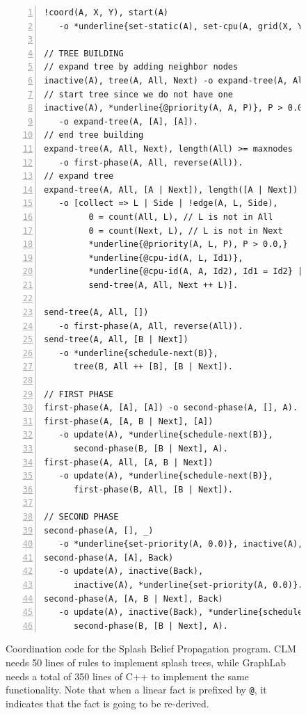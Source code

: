 \begin{figure}[h!]
\scriptsize\begin{Verbatim}[numbers=left,commandchars=*\{\}]
!coord(A, X, Y), start(A)
   -o *underline{set-static(A), set-cpu(A, grid(X, Y))}.

// TREE BUILDING
// expand tree by adding neighbor nodes
inactive(A), tree(A, All, Next) -o expand-tree(A, All, Next).
// start tree since we do not have one
inactive(A), *underline{@priority(A, A, P)}, P > 0.0
   -o expand-tree(A, [A], [A]).
// end tree building
expand-tree(A, All, Next), length(All) >= maxnodes
   -o first-phase(A, All, reverse(All)).
// expand tree
expand-tree(A, All, [A | Next]), length([A | Next]) < maxnodes
   -o [collect => L | Side | !edge(A, L, Side),
         0 = count(All, L), // L is not in All
         0 = count(Next, L), // L is not in Next
         *underline{@priority(A, L, P), P > 0.0,}
         *underline{@cpu-id(A, L, Id1)},
         *underline{@cpu-id(A, A, Id2), Id1 = Id2} |
         send-tree(A, All, Next ++ L)].

send-tree(A, All, [])
   -o first-phase(A, All, reverse(All)).
send-tree(A, All, [B | Next])
   -o *underline{schedule-next(B)},
      tree(B, All ++ [B], [B | Next]).

// FIRST PHASE
first-phase(A, [A], [A]) -o second-phase(A, [], A).
first-phase(A, [A, B | Next], [A])
   -o update(A), *underline{schedule-next(B)},
      second-phase(B, [B | Next], A).
first-phase(A, All, [A, B | Next])
   -o update(A), *underline{schedule-next(B)},
      first-phase(B, All, [B | Next]).

// SECOND PHASE
second-phase(A, [], _)
   -o *underline{set-priority(A, 0.0)}, inactive(A), update(A).
second-phase(A, [A], Back)
   -o update(A), inactive(Back),
      inactive(A), *underline{set-priority(A, 0.0)}.
second-phase(A, [A, B | Next], Back)
   -o update(A), inactive(Back), *underline{schedule-next(B)},
      second-phase(B, [B | Next], A).
\end{Verbatim}
  \caption{Coordination code for the Splash Belief Propagation program. CLM needs
     50 lines of rules to implement splash trees, while GraphLab needs a
     total of 350 lines of C++ to implement the same functionality.  Note
     that when a linear fact is prefixed by \texttt{@}, it indicates that the
     fact is going to be re-derived.}
  \label{code:sbp}
\end{figure}
\normalsize

